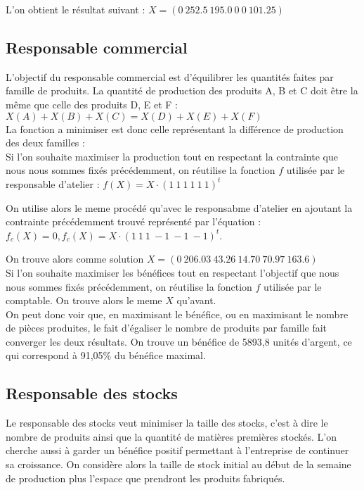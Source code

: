 \documentclass[a4paper, 11pt]{article}
\begin{document}
L'on obtient le résultat suivant : $ X = (0~252.5~195.0~0~0~101.25) $ \\

\subsection{Responsable commercial}
L'objectif du responsable commercial est d'équilibrer les quantités faites par famille de produits.
La quantité de production des produits A, B et C doit être la même que celle des produits D, E et F : \\
$X(A) + X(B) + X(C) = X(D) + X(E) + X(F)$ \\

La fonction a minimiser est donc celle représentant la différence de production des deux familles : \\
Si l’on souhaite maximiser la production tout en respectant la contrainte que nous
nous sommes fixés précédemment, on réutilise la fonction $f$ utilisée par le
responsable d’atelier : $ f(X) = X\cdot(1~1~1~1~1~1)^t $

On utilise alors le meme procédé qu'avec le responsabme d'atelier en ajoutant
la contrainte précédemment trouvé représenté par l'équation : \\
$ f_c(X) = 0, f_c(X) = X\cdot(1~1~1~-1~-1~-1)^t $.

On trouve alors comme solution $X = (0~206.03~43.26~14.70~70.97~163.6) $ \\

Si l’on souhaite maximiser les bénéfices tout en respectant l’objectif que nous
nous sommes fixés précédemment, on réutilise la fonction $f$ utilisée par le
comptable. On trouve alors le meme $X$ qu'avant. \\

On peut donc voir que, en maximisant le bénéfice, ou en maximisant le nombre de
pièces produites, le fait d’égaliser le nombre de produits par famille fait
converger les deux résultats. On trouve un bénéfice de 5893,8 unités d’argent,
ce qui correspond à 91,05\% du bénéfice maximal.


\subsection{Responsable des stocks}
Le responsable des stocks veut minimiser la taille des stocks, c'est à dire le
nombre de produits ainsi que la quantité de matières premières stockés. L'on
cherche aussi à garder un bénéfice positif permettant à l'entreprise de
continuer sa croissance. On considère alors la taille de stock initial au début
de la semaine de production plus l'espace que prendront les produits fabriqués.
\end{document}
